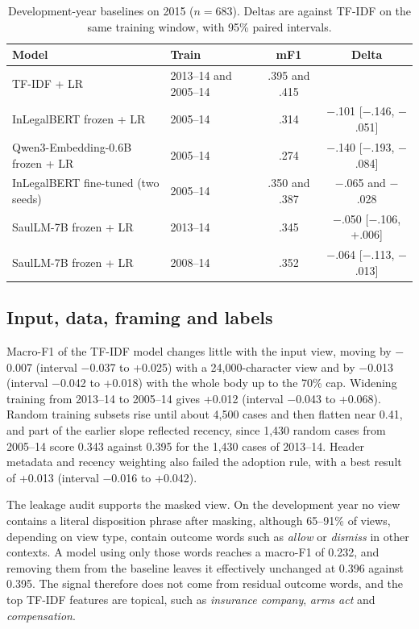 \documentclass[11pt,a4paper]{article}
\begin{document}
\begin{table}[t]\centering\small
\caption{Development-year baselines on 2015 ($n=683$). Deltas are against TF-IDF on the same training window, with 95\% paired intervals.}\label{tab:baselines}
\begin{tabular}{@{}llcc@{}}\toprule
Model & Train & mF1 & Delta\\\midrule
TF-IDF + LR & 2013--14 and 2005--14 & .395 and .415 & \\
InLegalBERT frozen + LR & 2005--14 & .314 & $-$.101 [$-$.146, $-$.051]\\
Qwen3-Embedding-0.6B frozen + LR & 2005--14 & .274 & $-$.140 [$-$.193, $-$.084]\\
InLegalBERT fine-tuned (two seeds) & 2005--14 & .350 and .387 & $-$.065 and $-$.028\\
SaulLM-7B frozen + LR & 2013--14 & .345 & $-$.050 [$-$.106, +.006]\\
SaulLM-7B frozen + LR & 2008--14 & .352 & $-$.064 [$-$.113, $-$.013]\\\bottomrule
\end{tabular}\end{table}

\subsection{Input, data, framing and labels}
Macro-F1 of the TF-IDF model changes little with the input view, moving by $-$0.007 (interval $-$0.037 to +0.025) with a 24,000-character view and by $-$0.013 (interval $-$0.042 to +0.018) with the whole body up to the 70\% cap. Widening training from 2013--14 to 2005--14 gives +0.012 (interval $-$0.043 to +0.068). Random training subsets rise until about 4,500 cases and then flatten near 0.41, and part of the earlier slope reflected recency, since 1,430 random cases from 2005--14 score 0.343 against 0.395 for the 1,430 cases of 2013--14. Header metadata and recency weighting also failed the adoption rule, with a best result of +0.013 (interval $-$0.016 to +0.042).

The leakage audit supports the masked view. On the development year no view contains a literal disposition phrase after masking, although 65--91\% of views, depending on view type, contain outcome words such as \emph{allow} or \emph{dismiss} in other contexts. A model using only those words reaches a macro-F1 of 0.232, and removing them from the baseline leaves it effectively unchanged at 0.396 against 0.395. The signal therefore does not come from residual outcome words, and the top TF-IDF features are topical, such as \emph{insurance company}, \emph{arms act} and \emph{compensation}.
\end{document}
